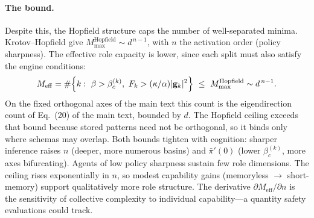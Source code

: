 \documentclass[
  aps,prx,
  preprint,
  superscriptaddress,
  nofootinbib
]{revtex4-2}
\newcommand{\g}{\mathbf{g}}
\newcommand{\pibar}{\bar\pi}
\begin{document}
\paragraph{The bound.} Despite this, the Hopfield structure caps the number of well-separated minima. Krotov--Hopfield give $M^{\mathrm{Hopfield}}_{\max}\sim d^{\,n-1}$, with $n$ the activation order (policy sharpness). The effective role capacity is lower, since each split must also satisfy the engine conditions:
\begin{equation}\label{SM-eq:sm-capacity}
M_{\mathrm{eff}}=\#\Bigl\{k:\ \beta>\beta_c^{(k)},\ F_k>(\kappa/\alpha)|\g_k|^2\Bigr\}\ \le\ M^{\mathrm{Hopfield}}_{\max}\sim d^{\,n-1}.
\end{equation}
On the fixed orthogonal axes of the main text this count is the eigendirection count of Eq.~(20) of the main text, bounded by $d$. The Hopfield ceiling exceeds that bound because stored patterns need not be orthogonal, so it binds only where schemas may overlap. Both bounds tighten with cognition: sharper inference raises $n$ (deeper, more numerous basins) and $\pibar'(0)$ (lower $\beta_c^{(k)}$, more axes bifurcating). Agents of low policy sharpness sustain few role dimensions. The ceiling rises exponentially in $n$, so modest capability gains (memoryless $\to$ short-memory) support qualitatively more role structure. The derivative $\partial M_{\mathrm{eff}}/\partial n$ is the sensitivity of collective complexity to individual capability---a quantity safety evaluations could track.
\end{document}
